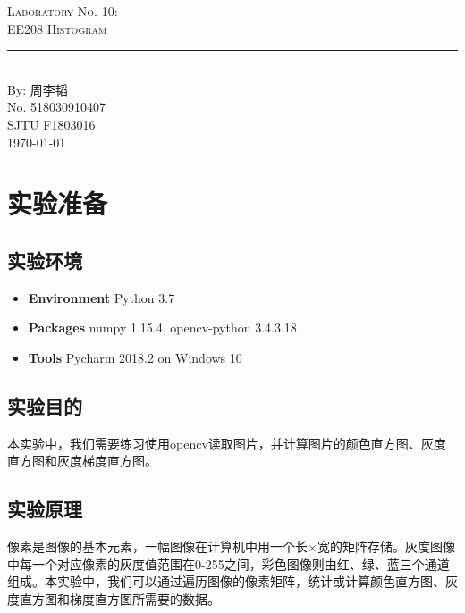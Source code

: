 \documentclass{article}
\newcommand{\labno}{10}
\newcommand{\labtitle}{EE208 Histogram}
\newcommand{\authorname}{周李韬}
\newcommand{\studentno}{518030910407}
\newcommand{\classno}{F1803016}
\begin{document}
\begin{center}
{\LARGE \textsc{Laboratory No. \labno:} \\ \vspace{4pt}}
{\Large \textsc{\labtitle} \\ \vspace{4pt}} 
\rule[13pt]{\textwidth}{1pt} \\ \vspace{15pt}
{\large By: \authorname \\ \vspace{10pt}
No. \studentno \\ \vspace{10pt}
SJTU \classno \\ \vspace{10pt}
\today \vspace{20pt}}
\end{center}



\section{实验准备}

\subsection{实验环境}
\begin{itemize}
\item\textbf{Environment} Python 3.7
\item\textbf{Packages} numpy 1.15.4, opencv-python 3.4.3.18
\item\textbf{Tools} Pycharm 2018.2 on Windows 10
\end{itemize}

\subsection{实验目的}

本实验中，我们需要练习使用opencv读取图片，并计算图片的颜色直方图、灰度直方图和灰度梯度直方图。

\subsection{实验原理}

像素是图像的基本元素，一幅图像在计算机中用一个长$\times$宽的矩阵存储。灰度图像中每一个对应像素的灰度值范围在0-255之间，彩色图像则由红、绿、蓝三个通道组成。本实验中，我们可以通过遍历图像的像素矩阵，统计或计算颜色直方图、灰度直方图和梯度直方图所需要的数据。
\end{document}
